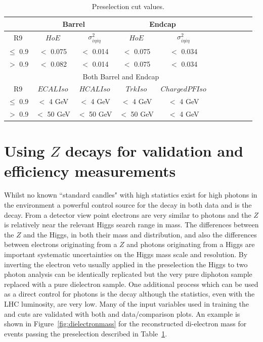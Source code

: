 \begin{table}
\noindent
  \begin{center}
  \caption{Preselection cut values.}
    \begin{tabular}{|c|c|c|c|c|c|c|c|c|c|c|}
                & \multicolumn{2}{c|}{Barrel} & \multicolumn{2}{c|}{Endcap} \\ \hline
      R9        & $HoE$ & $\sigma^{2}_{i\eta i\eta}$ & $HoE$ & $\sigma^{2}_{i\eta i\eta}$  \\ \hline
      $\le$ 0.9 & $<$ 0.075 & $<$ 0.014 & $<$ 0.075 & $<$ 0.034 \\ \hline
      $>$ 0.9   & $<$ 0.082 & $<$ 0.014 & $<$ 0.075 & $<$ 0.034  \\ \hline    
                & \multicolumn{4}{c|}{Both Barrel and Endcap}\\ \hline
      R9        & $ECALIso$ & $HCALIso$ &  $TrkIso$ & $ChargedPFIso$ \\ \hline
      $\le$ 0.9 &$<$ 4 GeV & $<$ 4 GeV & $<$ 4 GeV & $<$ 4 GeV\\ \hline
      $>$ 0.9   &$<$ 50 GeV & $<$ 50 GeV & $<$ 50 GeV & $<$ 4 GeV\\ 
    \end{tabular}
  \label{table:preselection}
  \end{center}
\end{table}

\section{Using $Z$ decays for validation and efficiency measurements}
\label{sec:zee}

Whilst no known ``standard candles" with high statistics exist for high \pT photons in the \LHC environment a powerful control source for the \Hgg decay in both data and \MC is the \Zee decay. From a detector view point electrons are very similar to photons and the $Z$ is relatively near the relevant Higgs search range in mass. The differences between the $Z$ and the Higgs, in both their mass and \pT distribution, and also the differences between electrons originating from a $Z$ and photons originating from a Higgs are important systematic uncertainties on the Higgs mass scale and resolution. By inverting the electron veto usually applied in the preselection the Higgs to two photon analysis can be identically replicated but the very pure diphoton sample replaced with a pure dielectron sample. One additional process which can be used as a direct control for photons is the \Zmumugamma decay although the statistics, even with the LHC luminosity, are very low. Many of the input variables used in training the \BDTs and cuts are validated with both \Zee and \Zmumugamma data/\MC comparison plots. An example is shown in Figure~\ref{fig:dielectronmass} for the reconstructed di-electron mass for events passing the preselection described in Table~\ref{table:preselection}.

